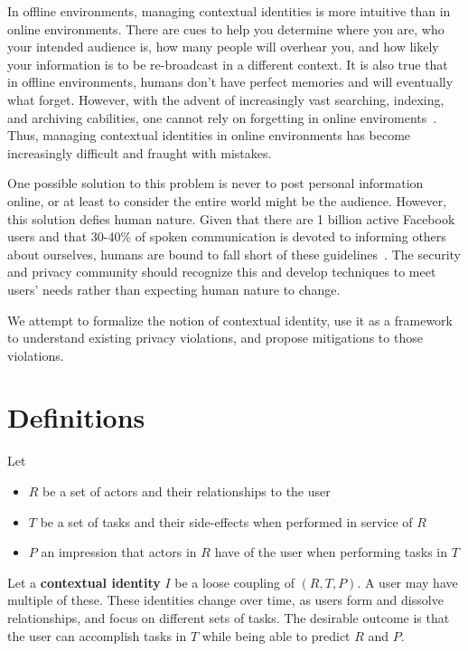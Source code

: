 \documentclass{llncs}
\begin{document}
In offline environments, managing contextual identities is more intuitive than
in online environments. There are cues to help you determine where you are,
who your intended audience is, how many people will overhear you, and how
likely your information is to be re-broadcast in a different context. It is
also true that in offline environments, humans don't have perfect memories and
will eventually what forget.  However, with the advent of increasingly vast
searching, indexing, and archiving cabilities, one cannot rely on forgetting in
online enviroments~\cite{delete}. Thus, managing contextual identities in
online environments has become increasingly difficult and fraught with
mistakes.

One possible solution to this problem is never to post personal information
online, or at least to consider the entire world might be the audience.
However, this solution defies human nature. Given that there are 1 billion
active Facebook users and that 30-40\% of spoken communication is devoted to
informing others about ourselves, humans are bound to fall short of these
guidelines~\cite{tamir,fbusers}. The security and privacy community should
recognize this and develop techniques to meet users' needs rather than
expecting human nature to change.

We attempt to formalize the notion of contextual identity, use it as a
framework to understand existing privacy violations, and propose mitigations to
those violations.

\section{Definitions}
Let
\begin{itemize}
\item $R$ be a set of actors and their relationships to the user
\item $T$ be a set of tasks and their side-effects when performed in service of
$R$
\item $P$ an impression that actors in $R$ have of the user when performing tasks in $T$
\end{itemize}
Let a \textbf{contextual identity} $I$ be a loose coupling of $(R, T, P)$.
A user may have multiple of these. These identities change over time, as users
form and dissolve relationships, and focus on different sets of tasks. The
desirable outcome is that the user can accomplish tasks in $T$ while being able
to predict $R$ and $P$.
\end{document}
